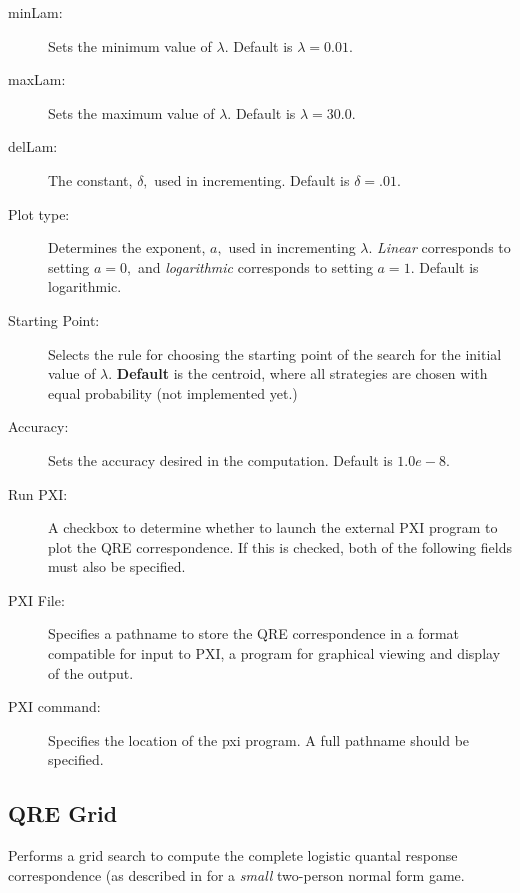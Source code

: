 \begin{description}
\item[minLam:] Sets the minimum value of $\lambda.$ 
Default is $\lambda = 0.01$.
\item[maxLam:] Sets the maximum value of $\lambda.$  Default is 
$\lambda = 30.0.$
\item[delLam:]  The constant, $\delta,$ used in incrementing.   Default is 
$\delta = .01.$
\item[Plot type:] Determines the exponent, $a,$ used in incrementing 
$\lambda.$  {\em Linear} corresponds to setting $a = 0,$ and {\em 
logarithmic} corresponds to setting $a = 1.$ Default is logarithmic.
\item[Starting Point:] Selects the rule for choosing the starting
point of the search for the initial value of $\lambda.$ {\bf Default} 
is the centroid, where all strategies are chosen with equal
probability (not implemented yet.)
\item[Accuracy:] Sets the accuracy desired in the computation.
Default is $1.0e-8.$ 
\item[Run PXI:] A checkbox to determine whether to launch the external
PXI program to plot the QRE correspondence.  If this is checked, both
of the following fields must also be specified.
\item[PXI File:] Specifies a pathname to store the QRE correspondence
in a format compatible for input to PXI, a program for graphical
viewing and display of the output.
\item[PXI command:] Specifies the location of the pxi program.  A full
pathname should be specified.
\end{description}

\subsection{QRE Grid}\label{QREAll}
Performs a grid search to compute the complete logistic
quantal response correspondence (as described in \cite{McKPal:95a}
for a {\em small} two-person normal form game.

